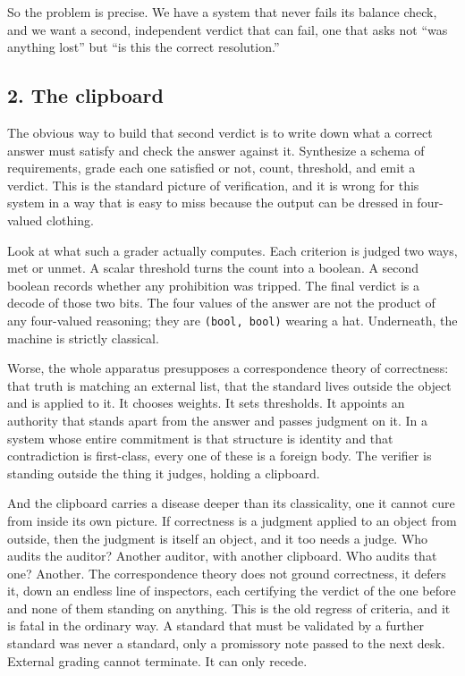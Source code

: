 So the problem is precise. We have a system that never fails its balance
check, and we want a second, independent verdict that can fail, one that
asks not ``was anything lost'' but ``is this the correct resolution.''

\hypertarget{the-clipboard}{%
\subsection{2. The clipboard}\label{the-clipboard}}

The obvious way to build that second verdict is to write down what a
correct answer must satisfy and check the answer against it. Synthesize
a schema of requirements, grade each one satisfied or not, count,
threshold, and emit a verdict. This is the standard picture of
verification, and it is wrong for this system in a way that is easy to
miss because the output can be dressed in four-valued clothing.

Look at what such a grader actually computes. Each criterion is judged
two ways, met or unmet. A scalar threshold turns the count into a
boolean. A second boolean records whether any prohibition was tripped.
The final verdict is a decode of those two bits. The four values of the
answer are not the product of any four-valued reasoning; they are
\texttt{(bool,\ bool)} wearing a hat. Underneath, the machine is
strictly classical.

Worse, the whole apparatus presupposes a correspondence theory of
correctness: that truth is matching an external list, that the standard
lives outside the object and is applied to it. It chooses weights. It
sets thresholds. It appoints an authority that stands apart from the
answer and passes judgment on it. In a system whose entire commitment is
that structure is identity and that contradiction is first-class, every
one of these is a foreign body. The verifier is standing outside the
thing it judges, holding a clipboard.

And the clipboard carries a disease deeper than its classicality, one it
cannot cure from inside its own picture. If correctness is a judgment
applied to an object from outside, then the judgment is itself an
object, and it too needs a judge. Who audits the auditor? Another
auditor, with another clipboard. Who audits that one? Another. The
correspondence theory does not ground correctness, it defers it, down an
endless line of inspectors, each certifying the verdict of the one
before and none of them standing on anything. This is the old regress of
criteria, and it is fatal in the ordinary way. A standard that must be
validated by a further standard was never a standard, only a promissory
note passed to the next desk. External grading cannot terminate. It can
only recede.

